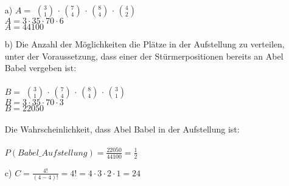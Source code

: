 \begin{enumerate}
	\item[a)] 
				$A = $ $ 3 \choose 1 $ $ \cdot $ $ 7 \choose 4 $ $ \cdot $ $ 8 \choose 4 $ $ \cdot $ $ 4 \choose 2 $\\
				$A = 3 \cdot 35 \cdot 70 \cdot 6$\\
				$A = 44100 $
	\item[b)]
				Die Anzahl der Möglichkeiten die Plätze in der Aufstellung zu verteilen, unter der Voraussetzung, dass einer der Stürmerpositionen bereits an Abel Babel vergeben ist:\\
				\\
				$B = $ $ 3 \choose 1 $ $ \cdot $ $ 7 \choose 4 $ $ \cdot $ $ 8 \choose 4 $ $ \cdot $ $ 3 \choose 1 $\\
				$B = 3 \cdot 35 \cdot 70 \cdot 3 $\\
				$B = 22050$\\
				\\
				Die Wahrscheinlichkeit, dass Abel Babel in der Aufstellung ist:\\
				\\
				$P(Babel\_Aufstellung) = \frac{22050}{44100} = \frac{1}{2}$
	\item[c)]	
				$C = \frac{4!}{(4-4)!}= 4! = 4 \cdot 3 \cdot 2 \cdot 1 = 24$
\end{enumerate}

